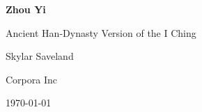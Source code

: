 \begin{titlepage}
    \centering
    \vspace*{1in}
    {\Huge\bfseries Zhou Yi\par}
    \vspace{0.5in}
    {\Large Ancient Han-Dynasty Version of the I Ching \par}
    \vspace{1in}
    {\Large Skylar Saveland\par}
    {\Large Corpora Inc\par}
    \vfill
    {\large \today\par}
\end{titlepage}
